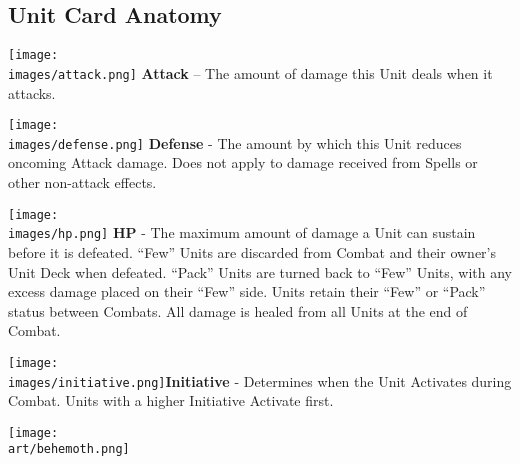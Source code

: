 \begin{multicols}{2}
\subsection*{Unit Card Anatomy}

\vspace{0pt}

\texttt{[image: \\images/attack.png]} \textbf{Attack} – The amount of damage this Unit deals when it attacks.\par
\texttt{[image: \\images/defense.png]} \textbf{Defense} - The amount by which this Unit reduces oncoming Attack damage.
Does not apply to damage received from Spells or other non-attack effects.\par
\texttt{[image: \\images/hp.png]} \textbf{\hypertarget{HP}{HP}} - The maximum amount of damage a Unit can sustain before it is defeated.
``Few'' Units are discarded from Combat and their owner's Unit Deck when defeated.
``Pack'' Units are turned back to ``Few'' Units, with any excess damage placed on their ``Few'' side.
Units retain their ``Few'' or ``Pack'' status between Combats.
All damage is healed from all Units at the end of Combat.\par
\texttt{[image: \\images/initiative.png]}{\hypertarget{Initiative}{\textbf{Initiative}}} - Determines when the Unit Activates during Combat.
Units with a higher Initiative Activate first.

\vfill
\hspace{-2em}
\texttt{[image: \\art/behemoth.png]}


\end{multicols}
